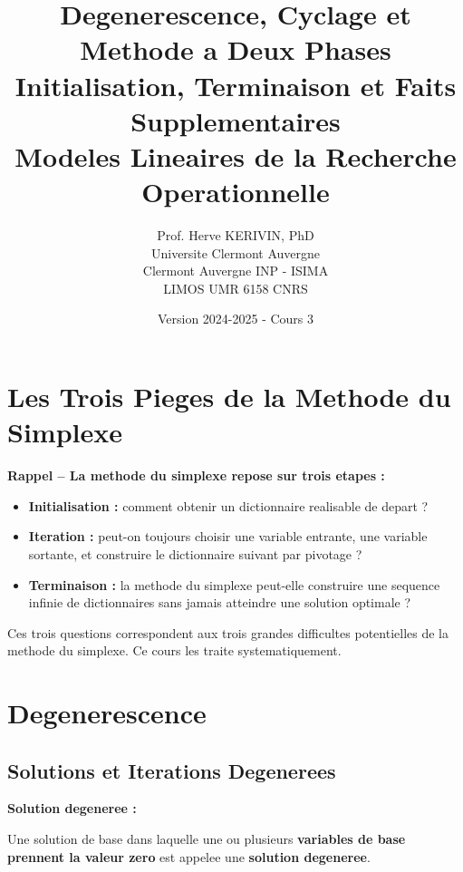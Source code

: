 \documentclass[12pt,a4paper]{article}
\title{\textbf{\Huge\color{titrebleu}Degenerescence, Cyclage et Methode a Deux Phases}\\[0.5em]
\large\color{defvert}Initialisation, Terminaison et Faits Supplementaires\\
\small Modeles Lineaires de la Recherche Operationnelle}
\author{\large Prof. Herve KERIVIN, PhD\\
\small Universite Clermont Auvergne\\
Clermont Auvergne INP - ISIMA\\
LIMOS UMR 6158 CNRS}
\date{\large Version 2024-2025 - Cours 3}
\begin{document}
\maketitle
\tableofcontents
\newpage

\section{Les Trois Pieges de la Methode du Simplexe}

\begin{notecours}
\textbf{Rappel -- La methode du simplexe repose sur trois etapes :}
\begin{itemize}
    \item \textcolor{titrebleu}{\textbf{Initialisation :}} comment obtenir un dictionnaire realisable de depart ?
    \item \textcolor{defvert}{\textbf{Iteration :}} peut-on toujours choisir une variable entrante, une variable sortante, et construire le dictionnaire suivant par pivotage ?
    \item \textcolor{importantrouge}{\textbf{Terminaison :}} la methode du simplexe peut-elle construire une sequence infinie de dictionnaires sans jamais atteindre une solution optimale ?
\end{itemize}
\end{notecours}

\begin{astuce}
Ces trois questions correspondent aux trois grandes difficultes potentielles de la methode du simplexe. Ce cours les traite systematiquement.
\end{astuce}

\section{Degenerescence}

\subsection{Solutions et Iterations Degenerees}

\begin{definition}
\textbf{Solution degeneree :}

Une solution de base dans laquelle une ou plusieurs \textcolor{importantrouge}{\textbf{variables de base prennent la valeur zero}} est appelee une \textcolor{defvert}{\textbf{solution degeneree}}.
\end{definition}
\end{document}
